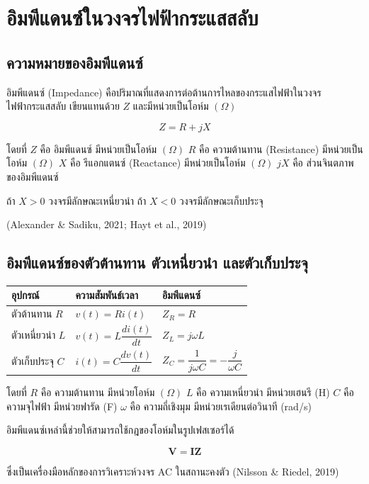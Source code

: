 \section{อิมพีแดนซ์ในวงจรไฟฟ้ากระแสสลับ}

\subsection{ความหมายของอิมพีแดนซ์}

อิมพีแดนซ์ (Impedance) คือปริมาณที่แสดงการต่อต้านการไหลของกระแสไฟฟ้าในวงจรไฟฟ้ากระแสสลับ เขียนแทนด้วย $Z$ และมีหน่วยเป็นโอห์ม $(\Omega)$

\[
Z=R+jX
\]

โดยที่  
$Z$ คือ อิมพีแดนซ์ มีหน่วยเป็นโอห์ม $(\Omega)$  
$R$ คือ ความต้านทาน (Resistance) มีหน่วยเป็นโอห์ม $(\Omega)$  
$X$ คือ รีแอกแตนซ์ (Reactance) มีหน่วยเป็นโอห์ม $(\Omega)$  
$jX$ คือ ส่วนจินตภาพของอิมพีแดนซ์

ถ้า $X>0$ วงจรมีลักษณะเหนี่ยวนำ  
ถ้า $X<0$ วงจรมีลักษณะเก็บประจุ

(Alexander \& Sadiku, 2021; Hayt et al., 2019)

\subsection{อิมพีแดนซ์ของตัวต้านทาน ตัวเหนี่ยวนำ และตัวเก็บประจุ}

\begin{longtable}{L{0.25\textwidth}L{0.35\textwidth}L{0.30\textwidth}}
\toprule
\textbf{อุปกรณ์} & \textbf{ความสัมพันธ์เวลา} & \textbf{อิมพีแดนซ์} \\
\midrule
ตัวต้านทาน $R$ & $v(t)=Ri(t)$ & $Z_R=R$ \\
ตัวเหนี่ยวนำ $L$ & $v(t)=L\dfrac{di(t)}{dt}$ & $Z_L=j\omega L$ \\
ตัวเก็บประจุ $C$ & $i(t)=C\dfrac{dv(t)}{dt}$ & $Z_C=\dfrac{1}{j\omega C}=-\dfrac{j}{\omega C}$ \\
\bottomrule
\end{longtable}

โดยที่  
$R$ คือ ความต้านทาน มีหน่วยโอห์ม $(\Omega)$  
$L$ คือ ความเหนี่ยวนำ มีหน่วยเฮนรี (H)  
$C$ คือ ความจุไฟฟ้า มีหน่วยฟารัด (F)  
$\omega$ คือ ความถี่เชิงมุม มีหน่วยเรเดียนต่อวินาที (rad/s)

อิมพีแดนซ์เหล่านี้ช่วยให้สามารถใช้กฎของโอห์มในรูปเฟสเซอร์ได้

\[
\mathbf{V}=\mathbf{I}\mathbf{Z}
\]

ซึ่งเป็นเครื่องมือหลักของการวิเคราะห์วงจร AC ในสถานะคงตัว (Nilsson \& Riedel, 2019)

